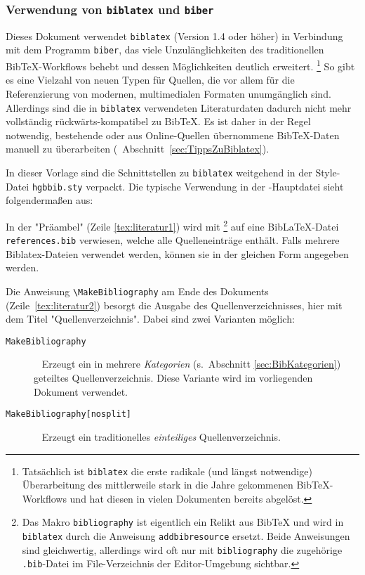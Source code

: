 \subsubsection{Verwendung von \texttt{biblatex} und \texttt{biber}}

Dieses Dokument verwendet \texttt{biblatex} (Version 1.4 oder höher) in
Verbindung mit dem Programm \texttt{biber}, das viele Unzulänglichkeiten des
traditionellen BibTeX-Workflows behebt und dessen Möglichkeiten deutlich
erweitert.%
\footnote{Tatsächlich ist \texttt{biblatex} die erste radikale (und längst
notwendige) Überarbeitung des mittlerweile stark in die Jahre gekommenen
BibTeX-Workflows und hat diesen in vielen Dokumenten bereits abgelöst.}
So gibt es eine Vielzahl von neuen Typen für Quellen, die vor allem für die
Referenzierung von modernen, multimedialen Formaten unumgänglich sind.
Allerdings sind die in \texttt{biblatex} verwendeten Literaturdaten dadurch
nicht mehr vollständig rückwärts-kompatibel zu BibTeX. Es ist daher in der
Regel notwendig, bestehende oder aus Online-Quellen übernommene BibTeX-Daten
manuell zu überarbeiten (\sa\ Abschnitt~\ref{sec:TippsZuBiblatex}).

In dieser Vorlage sind die Schnittstellen zu \texttt{biblatex} weitgehend in
der Style-Datei \nolinkurl{hgbbib.sty} verpackt. Die typische Verwendung in
der \latex-Haupt\-datei sieht folgendermaßen aus:
%
%
In der "Präambel" (Zeile \ref{tex:literatur1}) wird mit
\verb!!%
\footnote{Das Makro \texttt{{\bs}bibliography} ist eigentlich ein Relikt aus
BibTeX und wird in \texttt{biblatex} durch die Anweisung
\texttt{{\bs}addbibresource} ersetzt. Beide Anweisungen sind gleichwertig,
allerdings wird oft nur mit \texttt{{\bs}bibliography} die zugehörige
\texttt{.bib}-Datei im File-Verzeichnis der Editor-Umgebung sichtbar.}
auf eine BibLaTeX-Datei \nolinkurl{references.bib} verwiesen, welche alle
Quelleneinträge enthält.
Falls mehrere Bibla\-tex-Dateien verwendet werden, können sie in der gleichen
Form angegeben werden.

Die Anweisung \verb!\MakeBibliography! am Ende des Dokuments
(Zeile~\ref{tex:literatur2}) besorgt die Ausgabe des Quellenverzeichnisses,
hier mit dem Titel "Quellenverzeichnis". Dabei sind zwei Varianten möglich:
%
\begin{description}
    \item[\texttt{{\bs}MakeBibliography}] ~ \newline
    Erzeugt ein in mehrere \emph{Kategorien} (s.\ Abschnitt
    \ref{sec:BibKategorien}) geteiltes Quellenverzeichnis. Diese
    Variante wird im vorliegenden Dokument verwendet.
%
    \item[\texttt{{\bs}MakeBibliography[nosplit]}] ~ \newline
    Erzeugt ein traditionelles \emph{einteiliges} Quellenverzeichnis.
\end{description}


